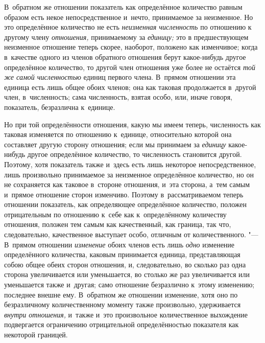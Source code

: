 В~обратном же отношении показатель как определённое количество равным образом
есть некое непосредственное и~нечто, принимаемое за неизменное. Но это
определённое количество не есть {\em неизменная численность} по отношению к
другому члену {\em отношения,} принимаемому за {\em единицу;} это в
предшествующем неизменное отношение теперь скорее, наоборот, положено как
изменчивое; когда в~качестве одного из членов обратного отношения берут
какое-нибудь другое определённое количество, то другой член отношения уже более
не остаётся {\em той же самой численностью} единиц первого члена. В~прямом
отношении эта единица есть лишь общее обоих членов; она как таковая
продолжается в~другой член, в~численность; сама численность, взятая особо, или,
иначе говоря, показатель, безразлична к~единице.

Но при той определённости отношения, какую мы имеем теперь, численность как
таковая изменяется по отношению к~единице, относительно которой она составляет
другую сторону отношения; если мы принимаем за {\em единицу} какое-нибудь
другое определённое количество, то численность становится другой. Поэтому, хотя
показатель также и~здесь есть лишь некоторое непосредственное, лишь произвольно
принимаемое за неизменное определённое количество, но он не сохраняется как
таковое в~стороне отношения, и~эта сторона, а~тем самым и~прямое отношение
сторон изменчиво. Поэтому в~рассматриваемом теперь отношении показатель, как
определяющее определённое количество, положен отрицательным по отношению к~себе
как к~определённому количеству отношения, положен тем самым как качественный,
как граница, так что, следовательно, качественное выступает особо, отличным от
количественного. "--- В~прямом отношении {\em изменение} обоих членов есть лишь
{\em одно} изменение определённого количества, каковым принимается единица,
представляющая собою общее обеих сторон отношения, и, следовательно, во сколько
раз одна сторона увеличивается или уменьшается, во столько же раз увеличивается
или уменьшается также и~другая; само отношение безразлично к~этому изменению;
последнее внешне ему. В~обратном же отношении изменение, хотя оно по
безразличному количественному моменту также произвольно, удерживается
{\em внутри отношения,} и~также и~это произвольное количественное выхождение
подвергается ограничению отрицательной определённостью показателя как
некоторой границей.

